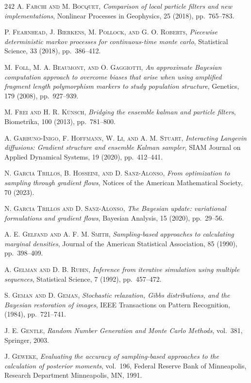 \begin{thebibliography}{242}
\textsc{A. Farchi and M. Bocquet},
\textit{Comparison of local particle filters and new implementations},
Nonlinear Processes in Geophysics, 25 (2018), pp.\ 765--783.

\textsc{P. Fearnhead, J. Bierkens, M. Pollock, and G. O. Roberts},
\textit{Piecewise deterministic markov processes for continuous-time monte carlo},
Statistical Science, 33 (2018), pp.\ 386--412.

\textsc{M. Foll, M. A. Beaumont, and O. Gaggiotti},
\textit{An approximate Bayesian computation approach to overcome biases that arise when using amplified fragment length polymorphism markers to study population structure},
Genetics, 179 (2008), pp.\ 927--939.

\textsc{M. Frei and H. R. K\"unsch},
\textit{Bridging the ensemble kalman and particle filters},
Biometrika, 100 (2013), pp.\ 781--800.

\textsc{A. Garbuno-Inigo, F. Hoffmann, W. Li, and A. M. Stuart},
\textit{Interacting Langevin diffusions: Gradient structure and ensemble Kalman sampler},
SIAM Journal on Applied Dynamical Systems, 19 (2020), pp.\ 412--441.

\textsc{N. Garcia Trillos, B. Hosseini, and D. Sanz-Alonso},
\textit{From optimization to sampling through gradient flows},
Notices of the American Mathematical Society, 70 (2023).

\textsc{N. Garcia Trillos and D. Sanz-Alonso},
\textit{The Bayesian update: variational formulations and gradient flows},
Bayesian Analysis, 15 (2020), pp.\ 29--56.

\textsc{A. E. Gelfand and A. F. M. Smith},
\textit{Sampling-based approaches to calculating marginal densities},
Journal of the American Statistical Association, 85 (1990), pp.\ 398--409.

\textsc{A. Gelman and D. B. Rubin},
\textit{Inference from iterative simulation using multiple sequences},
Statistical Science, 7 (1992), pp.\ 457--472.

\textsc{S. Geman and D. Geman},
\textit{Stochastic relaxation, Gibbs distributions, and the Bayesian restoration of images},
IEEE Transactions on Pattern Recognition, (1984), pp.\ 721--741.

\textsc{J. E. Gentle},
\textit{Random Number Generation and Monte Carlo Methods},
vol.\ 381, Springer, 2003.

\textsc{J. Geweke},
\textit{Evaluating the accuracy of sampling-based approaches to the calculation of posterior moments},
vol.\ 196, Federal Reserve Bank of Minneapolis, Research Department Minneapolis, MN, 1991.


\end{thebibliography}
